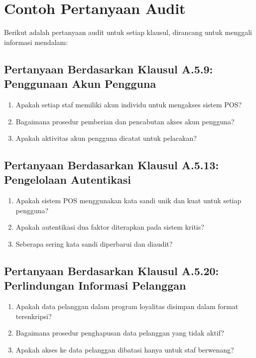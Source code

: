 \documentclass[12pt, a4paper]{report}
\begin{document}
\section{Contoh Pertanyaan Audit}
Berikut adalah pertanyaan audit untuk setiap klausul, dirancang untuk menggali informasi mendalam:

\subsection{Pertanyaan Berdasarkan Klausul A.5.9: Penggunaan Akun Pengguna}
\begin{enumerate}
    \item Apakah setiap staf memiliki akun individu untuk mengakses sistem POS?
    \item Bagaimana prosedur pemberian dan pencabutan akses akun pengguna?
    \item Apakah aktivitas akun pengguna dicatat untuk pelacakan? \citep{widodo2022keamanan}
\end{enumerate}

\subsection{Pertanyaan Berdasarkan Klausul A.5.13: Pengelolaan Autentikasi}
\begin{enumerate}
    \item Apakah sistem POS menggunakan kata sandi unik dan kuat untuk setiap pengguna?
    \item Apakah autentikasi dua faktor diterapkan pada sistem kritis?
    \item Seberapa sering kata sandi diperbarui dan diaudit? \citep{rijal2022iso}
\end{enumerate}

\subsection{Pertanyaan Berdasarkan Klausul A.5.20: Perlindungan Informasi Pelanggan}
\begin{enumerate}
    \item Apakah data pelanggan dalam program loyalitas disimpan dalam format terenkripsi?
    \item Bagaimana prosedur penghapusan data pelanggan yang tidak aktif?
    \item Apakah akses ke data pelanggan dibatasi hanya untuk staf berwenang? \citep{ratnasari2021pelindungan}
\end{enumerate}
\end{document}
